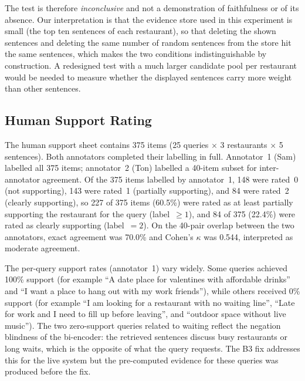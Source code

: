 The test is therefore \emph{inconclusive} and not a demonstration of faithfulness or of its absence. Our interpretation is that the evidence store used in this experiment is small (the top ten sentences of each restaurant), so that deleting the shown sentences and deleting the same number of random sentences from the store hit the same sentences, which makes the two conditions indistinguishable by construction. A redesigned test with a much larger candidate pool per restaurant would be needed to measure whether the displayed sentences carry more weight than other sentences.

\subsection{Human Support Rating}
\label{sec:resb2}

The human support sheet contains 375 items (25 queries $\times$ 3 restaurants $\times$ 5 sentences). Both annotators completed their labelling in full. Annotator~1 (Sam) labelled all 375 items; annotator~2 (Ton) labelled a 40-item subset for inter-annotator agreement. Of the 375 items labelled by annotator~1, 148 were rated~0 (not supporting), 143 were rated~1 (partially supporting), and 84 were rated~2 (clearly supporting), so 227 of 375 items (60.5\%) were rated as at least partially supporting the restaurant for the query (label~$\ge 1$), and 84 of 375 (22.4\%) were rated as clearly supporting (label~$=2$). On the 40-pair overlap between the two annotators, exact agreement was 70.0\% and Cohen's $\kappa$ was 0.544, interpreted as moderate agreement.

The per-query support rates (annotator~1) vary widely. Some queries achieved 100\% support (for example ``A date place for valentines with affordable drinks'' and ``I want a place to hang out with my work friends''), while others received 0\% support (for example ``I am looking for a restaurant with no waiting line'', ``Late for work and I need to fill up before leaving'', and ``outdoor space without live music''). The two zero-support queries related to waiting reflect the negation blindness of the bi-encoder: the retrieved sentences discuss busy restaurants or long waits, which is the opposite of what the query requests. The B3 fix addresses this for the live system but the pre-computed evidence for these queries was produced before the fix.

